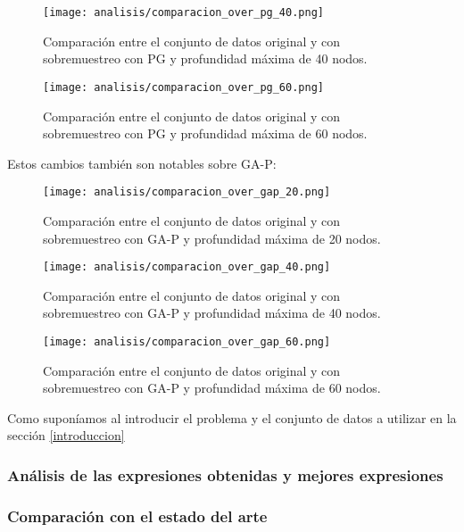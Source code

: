 \begin{figure}[H]
    \centering
	  \texttt{[image: analisis/comparacion\_over\_pg\_40.png]}
	  \caption{Comparación entre el conjunto de datos original y con sobremuestreo con PG y profundidad máxima de 40 nodos.}\label{fig:cmp_pg_over_40}

\end{figure}

\begin{figure}[H]
    \centering
	  \texttt{[image: analisis/comparacion\_over\_pg\_60.png]}
	  \caption{Comparación entre el conjunto de datos original y con sobremuestreo con PG y profundidad máxima de 60 nodos.}\label{fig:cmp_pg_over_60}

\end{figure}

Estos cambios también son notables sobre GA-P:

\begin{figure}[H]
    \centering
	  \texttt{[image: analisis/comparacion\_over\_gap\_20.png]}
	  \caption{Comparación entre el conjunto de datos original y con sobremuestreo con GA-P y profundidad máxima de 20 nodos.}\label{fig:cmp_gap_over_20}

\end{figure}

\begin{figure}[H]
    \centering
	  \texttt{[image: analisis/comparacion\_over\_gap\_40.png]}
	  \caption{Comparación entre el conjunto de datos original y con sobremuestreo con GA-P y profundidad máxima de 40 nodos.}\label{fig:cmp_gap_over_40}

\end{figure}

\begin{figure}[H]
    \centering
	  \texttt{[image: analisis/comparacion\_over\_gap\_60.png]}
	  \caption{Comparación entre el conjunto de datos original y con sobremuestreo con GA-P y profundidad máxima de 60 nodos.}\label{fig:cmp_gap_over_60}

\end{figure}

Como suponíamos al introducir el problema y el conjunto de datos a utilizar en la sección \ref{introduccion}

\subsubsection{Análisis de las expresiones obtenidas y mejores expresiones}

\subsubsection{Comparación con el estado del arte}




\newpage
